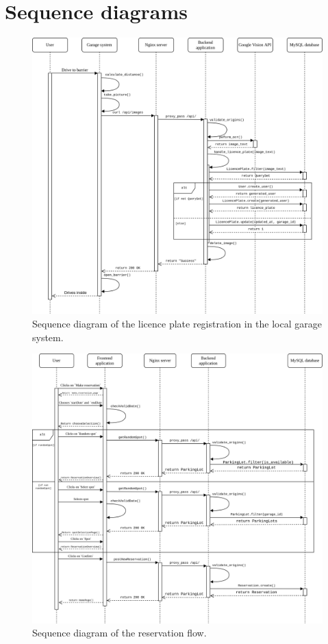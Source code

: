 \section{Sequence diagrams}\label{app:sequence-diagrams}

\begin{figure}[!hpt]
    \centering
    \includegraphics[width=16cm]{images/sequence_diagrams/sequence_diagram_licence_plate.drawio.png}
    \caption{Sequence diagram of the licence plate registration in the local garage system.}
    \label{fig:sequence-diagram-licence-plate}
\end{figure}

\begin{figure}[!hpt]
    \centering
    \includegraphics[width=16cm]{images/sequence_diagrams/sequence_diagram_reservation.drawio.png}
    \caption{Sequence diagram of the reservation flow.}
    \label{fig:sequence-diagram-reservation}
\end{figure}
\clearpage

